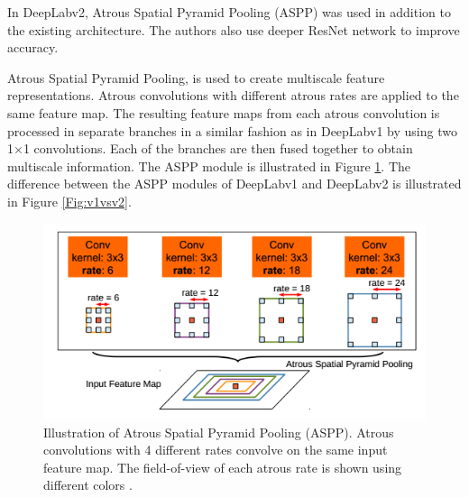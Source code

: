 In DeepLabv2, Atrous Spatial Pyramid Pooling (ASPP) was used in addition to the existing architecture. The authors also use deeper ResNet network to improve accuracy.

Atrous Spatial Pyramid Pooling, is used to create multiscale feature representations. Atrous convolutions with different atrous rates are applied to the same feature map. The resulting feature maps from each atrous convolution is processed in separate branches in a similar fashion as in DeepLabv1 by using two 1$\times$1 convolutions. Each of the branches are then fused together to obtain multiscale information. The ASPP module is illustrated in Figure \ref{Fig:aspp}. The difference between the ASPP modules of DeepLabv1 and DeepLabv2 is illustrated in Figure \ref{Fig:v1vsv2}.

	\begin{figure}[h]
		\centering
		\includegraphics[width=0.6\linewidth]{images/aspp}
		\caption{Illustration of Atrous Spatial Pyramid Pooling (ASPP). Atrous convolutions with 4 different rates convolve on the same input feature map. The field-of-view of each atrous rate is shown using different colors \cite{DBLP:journals/corr/ChenPK0Y16}.}
		\label{Fig:aspp}
	\end{figure}
	
